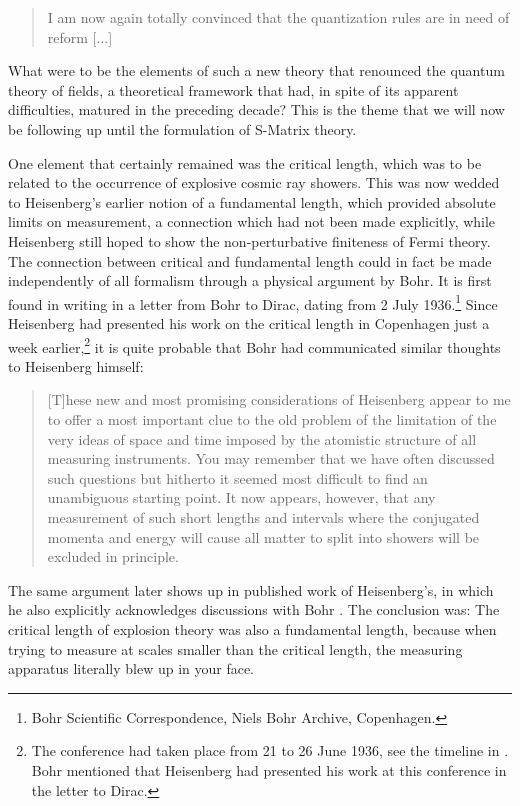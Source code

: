 \documentclass[12pt]{article}
\begin{document}
\begin{quote}
I am now again totally convinced that the quantization rules are in need of reform [...]
\end{quote}

What were to be the elements of such a new theory that renounced the quantum theory of fields, a theoretical framework that had, in spite of its apparent difficulties, matured in the preceding decade? This is the theme that we will now be following up until the formulation of S-Matrix theory.

One element that certainly remained was the critical length, which was to be related to the occurrence of explosive cosmic ray showers. This was now wedded to Heisenberg's earlier notion of a fundamental length, which provided absolute limits on measurement, a connection which had not been made explicitly, while Heisenberg still hoped to show the non-perturbative finiteness of Fermi theory. The connection between critical and fundamental length could in fact be made independently of all formalism through a physical argument by Bohr. It is first found in writing in a letter from Bohr to Dirac, dating from 2 July 1936.\footnote{Bohr Scientific Correspondence, Niels Bohr Archive, Copenhagen.} Since Heisenberg had presented his work on the critical length in Copenhagen just a week earlier,\footnote{The conference had taken place from 21 to 26 June 1936, see the timeline in \citep{hermann_1985_wissenschaftlicher}. Bohr mentioned that Heisenberg had presented his work at this conference in the letter to Dirac.} it is quite probable that Bohr had communicated similar thoughts to Heisenberg himself:

\begin{quote}
[T]hese new and most promising considerations of Heisenberg appear to me to offer a most important clue to the old problem of the limitation of the very ideas of space and time imposed by the atomistic structure of all measuring instruments. You may remember that we have often discussed such questions but hitherto it seemed most difficult to find an unambiguous starting point. It now appears, however, that any measurement of such short lengths and intervals where the conjugated momenta and energy will cause all matter to split into showers will be excluded in principle.
\end{quote}

The same argument later shows up in published work of Heisenberg's, in which he also explicitly acknowledges discussions with Bohr \citep{heisenberg_1938_uber-die-in-der-theorie}. The conclusion was: The critical length of explosion theory was also a fundamental length, because when trying to measure at scales smaller than the critical length, the measuring apparatus literally blew up in your face.
\end{document}

